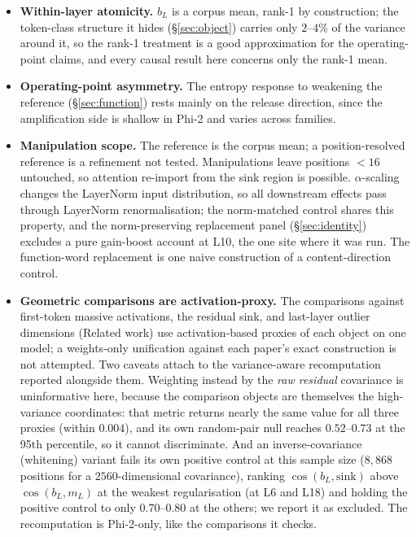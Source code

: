 \documentclass[11pt]{article}
\newcommand{\bl}{b_L}
\begin{document}
\begin{itemize}
  causal tests (\S\ref{sec:function}, \S\ref{sec:identity},
  \S\ref{sec:maintenance}), which do not use the correlation at all.
  The duty ordering is also largely norm-scaled ($\rho = -0.89$ from
  the read norm alone), so the reference's contribution to the ranking
  is the residue above that, which we have not decomposed further.
\item \textbf{Within-layer atomicity.} $\bl$ is a corpus mean, rank-1
  by construction; the token-class structure it hides
  (\S\ref{sec:object}) carries only $2$--$4\%$ of the variance around it,
  so the rank-1 treatment is a good approximation for the operating-point
  claims, and every causal result here concerns only the rank-1 mean.
\item \textbf{Operating-point asymmetry.} The entropy response to
  weakening the reference (\S\ref{sec:function}) rests mainly on the
  release direction, since the amplification side is shallow in Phi-2
  and varies across families.
\item \textbf{Manipulation scope.} The reference is the corpus mean; a
  position-resolved reference is a refinement not tested.
  Manipulations leave positions $<16$ untouched, so attention
  re-import from the sink region is possible. $\alpha$-scaling changes
  the LayerNorm input distribution, so all downstream effects pass
  through LayerNorm renormalisation; the norm-matched control shares this
  property, and the norm-preserving replacement panel
  (\S\ref{sec:identity}) excludes a pure gain-boost account at L10,
  the one site where it was run. The function-word replacement is one
  naive construction of a content-direction control.
\item \textbf{Geometric comparisons are activation-proxy.} The
  comparisons against first-token massive activations, the residual
  sink, and last-layer outlier dimensions (Related work) use
  activation-based proxies of each object on one model; a weights-only
  unification against each paper's exact construction is not
  attempted. Two caveats attach to the variance-aware recomputation
  reported alongside them. Weighting instead by the \emph{raw
  residual} covariance is uninformative here, because the comparison
  objects are themselves the high-variance coordinates: that metric
  returns nearly the same value for all three proxies (within $0.004$), and
  its own random-pair null reaches $0.52$--$0.73$ at the 95th
  percentile, so it cannot discriminate. And an inverse-covariance
  (whitening) variant fails its own positive control at this sample
  size ($8{,}868$ positions for a $2560$-dimensional covariance),
  ranking $\cos(\bl,\text{sink})$ above $\cos(\bl, m_L)$ at the weakest
  regularisation (at L6 and L18) and holding the positive control to only
  $0.70$--$0.80$ at the others; we report it
  as excluded. The recomputation is Phi-2-only,
  like the comparisons it checks.
\end{itemize}
\end{document}
